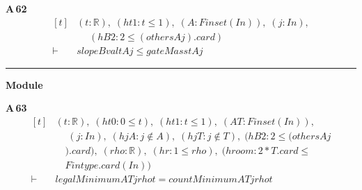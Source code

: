 \noindent\textbf{A\,62}\quad{}
{\footnotesize\[ \begin{aligned}[t]
&(\mathit{t} : \mathbb{R} ),\; (\mathit{ht1} : \mathit{t} \leq 1),\; (\mathit{A} : \mathit{Finset} (\mathit{I} \mathit{n})),\; (\mathit{j} : \mathit{I} \mathit{n}),\\
&\quad \; (\mathit{hB2} : 2 \leq (\mathit{others} \mathit{A} \mathit{j}).\mathit{card})\\
\vdash\;&\mathit{slopeBval} \mathit{t} \mathit{A} \mathit{j} \leq \mathit{gateMass} \mathit{t} \mathit{A} \mathit{j}
\end{aligned} \]}

\vspace{4pt}\noindent\rule{\columnwidth}{0.4pt}\par\vspace{2pt}
\noindent\textbf{Module }\par\vspace{3pt}

\noindent\textbf{A\,63}\quad{}
{\footnotesize\[ \begin{aligned}[t]
&(\mathit{t} : \mathbb{R} ),\; (\mathit{ht0} : 0 \leq \mathit{t}),\; (\mathit{ht1} : \mathit{t} \leq 1),\; (\mathit{A} \mathit{T} : \mathit{Finset} (\mathit{I} \mathit{n})),\\
&\quad \; (\mathit{j} : \mathit{I} \mathit{n}),\; (\mathit{hjA} : \mathit{j} \notin \mathit{A}),\; (\mathit{hjT} : \mathit{j} \notin \mathit{T}),\; (\mathit{hB2} : 2 \leq (\mathit{others} \mathit{A} \mathit{j}\\
&\quad ).\mathit{card}),\; (\mathit{rho} : \mathbb{R} ),\; (\mathit{hr} : 1 \leq \mathit{rho}),\; (\mathit{hroom} : 2*\mathit{T}.\mathit{card} \leq\\
&\quad \mathit{Fintype}.\mathit{card} (\mathit{I} \mathit{n}))\\
\vdash\;&\mathit{legalMinimum} \mathit{A} \mathit{T} \mathit{j} \mathit{rho} \mathit{t} = \mathit{countMinimum} \mathit{A} \mathit{T} \mathit{j} \mathit{rho} \mathit{t}
\end{aligned} \]}

